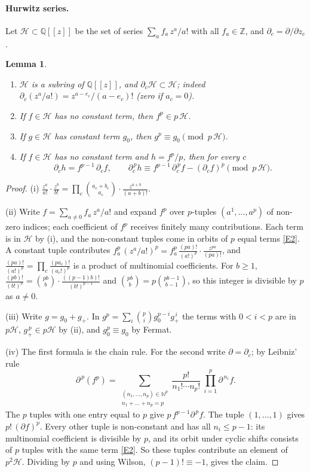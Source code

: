 \documentclass[11pt]{article}
\newtheorem{lemma}[theorem]{Lemma}
\theoremstyle{definition}
\theoremstyle{remark}
\newcommand{\Z}{\mathbb Z}
\newcommand{\Q}{\mathbb Q}
\newcommand{\N}{\mathbb N}
\newcommand{\Hur}{\mathcal H}
\begin{document}
\paragraph{Hurwitz series.} Let $\Hur\subset\Q[[z]]$ be the set of series
$\sum_af_a\,z^a/a!$ with all $f_a\in\Z$, and $\partial_c=\partial/\partial z_c$.

\begin{lemma}\label{lem:hur}
\begin{enumerate}[label=(\roman*)]
\item $\Hur$ is a subring of $\Q[[z]]$, and $\partial_c\Hur\subset\Hur$; indeed
      $\partial_c(z^a/a!)=z^{a-e_c}/(a-e_c)!$ (zero if $a_c=0$).
\item If $f\in\Hur$ has no constant term, then $f^p\in p\,\Hur$.
\item If $g\in\Hur$ has constant term $g_0$, then $g^p\equiv g_0\pmod{p\,\Hur}$.
\item If $f\in\Hur$ has no constant term and $h=f^p/p$, then for every $c$
\[
 \partial_ch=f^{p-1}\,\partial_cf,\qquad
 \partial_c^{\,p}h\equiv f^{p-1}\,\partial_c^{\,p}f-(\partial_cf)^p\pmod{p\,\Hur}.
\]
\end{enumerate}
\end{lemma}

\begin{proof}
(i) $\frac{z^a}{a!}\cdot\frac{z^b}{b!}=\prod_c\binom{a_c+b_c}{a_c}\cdot\frac{z^{a+b}}{(a+b)!}$.

(ii) Write $f=\sum_{a\ne0}f_a\,z^a/a!$ and expand $f^p$ over $p$-tuples $(a^1,\dots,a^p)$ of
non-zero indices; each coefficient of $f^p$ receives finitely many contributions. Each term is
in $\Hur$ by (i), and the non-constant tuples come in orbits of $p$ equal terms \ref{E2}. A
constant tuple contributes $f_a^p\,(z^a/a!)^p=f_a^p\,\frac{(pa)!}{(a!)^p}\cdot\frac{z^{pa}}{(pa)!}$,
and $\frac{(pa)!}{(a!)^p}=\prod_c\frac{(pa_c)!}{(a_c!)^p}$ is a product of multinomial
coefficients. For $b\ge1$,
$\frac{(pb)!}{(b!)^p}=\binom{pb}{b}\cdot\frac{((p-1)b)!}{(b!)^{p-1}}$ and
$\binom{pb}{b}=p\binom{pb-1}{b-1}$, so this integer is divisible by $p$ as $a\ne0$.

(iii) Write $g=g_0+g_+$. In $g^p=\sum_i\binom pig_0^{p-i}g_+^{\,i}$ the terms with $0<i<p$
are in $p\Hur$, $g_+^{\,p}\in p\Hur$ by (ii), and $g_0^p\equiv g_0$ by Fermat.

(iv) The first formula is the chain rule. For the second write $\partial=\partial_c$; by
Leibniz' rule
\[
 \partial^{\,p}(f^p)=\sum_{\substack{(n_1,\dots,n_p)\in\N^p\\ n_1+\dots+n_p=p}}
 \frac{p!}{n_1!\cdots n_p!}\ \prod_{i=1}^p\partial^{\,n_i}f .
\]
The $p$ tuples with one entry equal to $p$ give $p\,f^{p-1}\partial^{\,p}f$. The tuple
$(1,\dots,1)$ gives $p!\,(\partial f)^p$. Every other tuple is non-constant and has all
$n_i\le p-1$: its multinomial coefficient is divisible by $p$, and its orbit under cyclic
shifts consists of $p$ tuples with the same term \ref{E2}. So these tuples contribute an
element of $p^2\Hur$. Dividing by $p$ and using Wilson, $(p-1)!\equiv-1$, gives the claim.
\end{proof}
\end{document}
